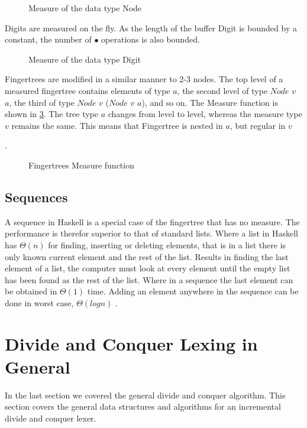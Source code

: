 \begin{figure}[h!]

\caption{Measure of the data type Node \label{fig:measureNode}}
\end{figure}

Digits are measured on the fly. As the length of the buffer Digit is bounded by
a constant, the number of $\bullet$ operations is also bounded.

\begin{figure}[h!]

\caption{Measure of the data type Digit \label{fig:measureDigit}}
\end{figure}

Fingertrees are modified in a similar manner to 2-3 nodes.
The top level of a measured fingertree contains elements of type $a$, the second
level of type $Node$ $v$ $a$, the third of type $Node$ $v$ ($Node$ $v$ $a$), and
so on. The Measure function is shown in \cref{fig:measureFingerTree}. The tree 
type $a$ changes from level to level, whereas the measure type $v$ remains the 
same. This means that Fingertree is nested in $a$, but regular in $v$ 

\cite{fingertree}.
\begin{figure}[h!]

\caption{Fingertrees Measure function \label{fig:measureFingerTree}}
\end{figure}


\subsection{Sequences}
A sequence in Haskell is a special case of the fingertree that has no measure.
The performance is therefor superior to that of standard lists. Where a list in
Haskell has $\Theta(n)$ for finding, inserting or deleting elements, that is in
a list there is only known current element and the rest of the list. Results in 
finding the last element of a list, the computer must look at every element
until the empty list has been found as the rest of the list. Where in a sequence
the last element can be obtained in $\Theta(1)$ time. Adding an element anywhere
in the sequence can be done in worst case, $\Theta(log n)$ \cite{fingertree}.

\section{Divide and Conquer Lexing in General}
In the last section we covered the general divide and conquer algorithm. This
section covers the general data structures and algorithms for an incremental
divide and conquer lexer.

